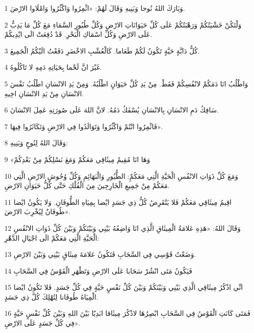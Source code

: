 \par 1 وَبَارَكَ اللهُ نُوحا وَبَنِيهِ وَقَالَ لَهُمْ: «اثْمِرُوا وَاكْثُرُوا وَامْلَاوا الارْضَ.
\par 2 وَلْتَكُنْ خَشْيَتُكُمْ وَرَهْبَتُكُمْ عَلَى كُلِّ حَيَوَانَاتِ الارْضِ وَكُلِّ طُيُورِ السَّمَاءِ مَعَ كُلِّ مَا يَدِبُّ عَلَى الارْضِ وَكُلِّ اسْمَاكِ الْبَحْرِ. قَدْ دُفِعَتْ الَى ايْدِيكُمْ.
\par 3 كُلُّ دَابَّةٍ حَيَّةٍ تَكُونُ لَكُمْ طَعَاما. كَالْعُشْبِ الاخْضَرِ دَفَعْتُ الَيْكُمُ الْجَمِيعَ.
\par 4 غَيْرَ انَّ لَحْما بِحَيَاتِهِ دَمِهِ لا تَاكُلُوهُ.
\par 5 وَاطْلُبُ انَا دَمَكُمْ لانْفُسِكُمْ فَقَطْ. مِنْ يَدِ كُلِّ حَيَوَانٍ اطْلُبُهُ. وَمِنْ يَدِ الانْسَانِ اطْلُبُ نَفْسَ الانْسَانِ مِنْ يَدِ الانْسَانِ اخِيهِ.
\par 6 سَافِكُ دَمِ الانْسَانِ بِالانْسَانِ يُسْفَكُ دَمُهُ. لانَّ اللهَ عَلَى صُورَتِهِ عَمِلَ الانْسَانَ.
\par 7 فَاثْمِرُوا انْتُمْ وَاكْثُرُوا وَتَوَالَدُوا فِي الارْضِ وَتَكَاثَرُوا فِيهَا».
\par 8 وَقَالَ اللهُ لِنُوحٍ وَبَنِيهِ:
\par 9 «وَهَا انَا مُقِيمٌ مِيثَاقِي مَعَكُمْ وَمَعَ نَسْلِكُمْ مِنْ بَعْدِكُمْ
\par 10 وَمَعَ كُلِّ ذَوَاتِ الانْفُسِ الْحَيَّةِ الَّتِي مَعَكُمِْ: الطُّيُورِ وَالْبَهَائِمِ وَكُلِّ وُحُوشِ الارْضِ الَّتِي مَعَكُمْ مِنْ جَمِيعِ الْخَارِجِينَ مِنَ الْفُلْكِ حَتَّى كُلُّ حَيَوَانِ الارْضِ.
\par 11 اقِيمُ مِيثَاقِي مَعَكُمْ فَلا يَنْقَرِضُ كُلُّ ذِي جَسَدٍ ايْضا بِمِيَاهِ الطُّوفَانِ. وَلا يَكُونُ ايْضا طُوفَانٌ لِيُخْرِبَ الارْضَ».
\par 12 وَقَالَ اللهُ: «هَذِهِ عَلامَةُ الْمِيثَاقِ الَّذِي انَا وَاضِعُهُ بَيْنِي وَبَيْنَكُمْ وَبَيْنَ كُلِّ ذَوَاتِ الانْفُسِ الْحَيَّةِ الَّتِي مَعَكُمْ الَى اجْيَالِ الدَّهْرِ:
\par 13 وَضَعْتُ قَوْسِي فِي السَّحَابِ فَتَكُونُ عَلامَةَ مِيثَاقٍ بَيْنِي وَبَيْنَ الارْضِ.
\par 14 فَيَكُونُ مَتَى انْشُرْ سَحَابا عَلَى الارْضِ وَتَظْهَرِ الْقَوْسُ فِي السَّحَابِ
\par 15 انِّي اذْكُرُ مِيثَاقِي الَّذِي بَيْنِي وَبَيْنَكُمْ وَبَيْنَ كُلِّ نَفْسٍ حَيَّةٍ فِي كُلِّ جَسَدٍ. فَلا تَكُونُ ايْضا الْمِيَاهُ طُوفَانا لِتُهْلِكَ كُلَّ ذِي جَسَدٍ.
\par 16 فَمَتَى كَانَتِ الْقَوْسُ فِي السَّحَابِ ابْصِرُهَا لاذْكُرَ مِيثَاقا ابَدِيّا بَيْنَ اللهِ وَبَيْنَ كُلِّ نَفْسٍ حَيَّةٍ فِي كُلِّ جَسَدٍ عَلَى الارْضِ».
